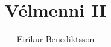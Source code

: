 \documentclass{article}
\begin{document}
\title{Vélmenni II}
\author{Eiríkur Benediktsson}
\maketitle
\newpage
\tableofcontents
\newpage








\end{document}
